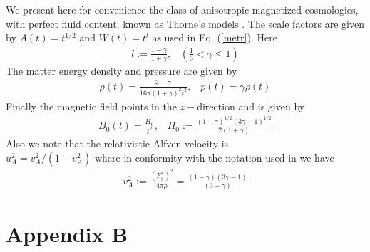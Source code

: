 \documentclass[prd,twocolumn,showpacs,preprintnumbers,amsmath,amssy mb]{revtex4}
\newcommand{\bea}{\begin{eqnarray}}
\newcommand{\eea}{\end{eqnarray}}
\begin{document}
We present here for convenience the class of anisotropic 
magnetized cosmologies, with perfect fluid content, known as 
Thorne's models \cite{thorn}. 
The scale factors are given by $A(t)=t^{1/2}$ 
and $W(t)=t^{l}$ as used in Eq. (\ref{metr}). Here 
\bea 
l:=\frac{1-\gamma }{1+\gamma },\; \; \; (\frac{1}{3}<\gamma \leq 1)
\eea
The matter energy density and pressure are given by 
\bea 
\rho (t)=\frac{3-\gamma }{16\pi (1+\gamma )^{2}t^{2}},
\; \; \; p(t)=\gamma \rho (t)
\eea
Finally the magnetic field points in the $z-$direction and 
is given by 
\bea 
\label{backmag}
B_{0}(t)=\frac{H_{0}}{t^{2}},\; \; \; 
H_{0}:=\frac{(1-\gamma )^{1/2}(3\gamma -1)^{1/2}}{2(1+\gamma )}
\eea
Also we note that the relativistic Alfven velocity is \\
$u_{A}^{2}=v_{A}^{2}/(1+v_{A}^{2})$ where in conformity 
with the notation used in \cite{thorn} we have 
\bea 
v_{A}^{2}:=\frac{(F^{x}_{y})^{2}}{4\pi \rho }=
\frac{(1-\gamma )(3\gamma -1)}{(3-\gamma )}
\eea
\section*{Appendix B }
\end{document}
